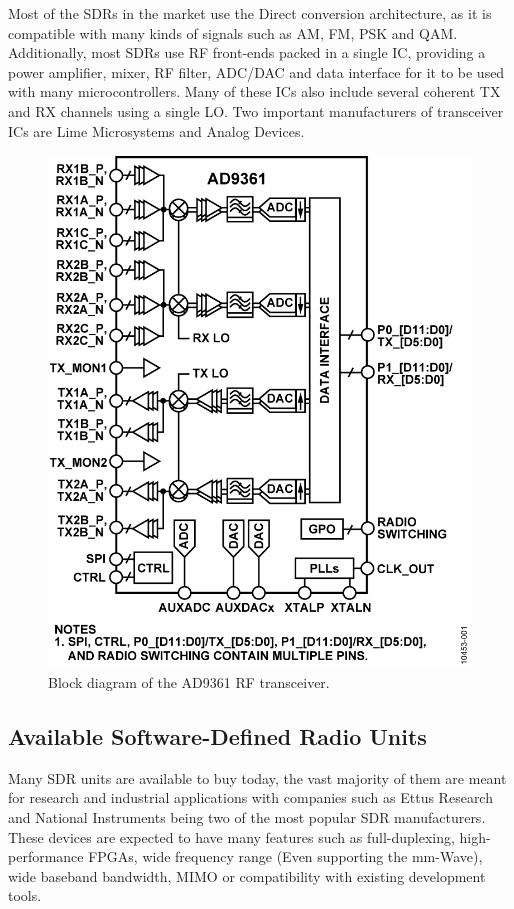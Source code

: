 \documentclass[12pt,a4paper]{report}
\begin{document}
Most of the SDRs in the market use the Direct conversion architecture, as it is compatible with many kinds of signals such as AM, FM, PSK and QAM. Additionally, most SDRs use RF front-ends packed in a single IC, providing a power amplifier, mixer, RF filter, ADC/DAC and data interface for it to be used with many microcontrollers. Many of these ICs also include several coherent TX and RX channels using a single LO. Two important manufacturers of transceiver ICs are Lime Microsystems and Analog Devices.

\begin{figure}[h]
    \centering
    \includegraphics[scale = 0.3]{Figures/AD9361.png}
    \caption[AD9361 RF Transceiver block diagram.]{Block diagram of the AD9361 RF transceiver. \cite{ad9361}}
    \label{fig:ad9361}
\end{figure}

\subsection{Available Software-Defined Radio Units} \label{back:sdr:avail}
Many SDR units are available to buy today, the vast majority of them are meant for research and industrial applications with companies such as Ettus Research and National Instruments being two of the most popular SDR manufacturers. These devices are expected to have many features such as full-duplexing, high-performance FPGAs, wide frequency range (Even supporting the mm-Wave), wide baseband bandwidth, MIMO or compatibility with existing development tools.
\end{document}
